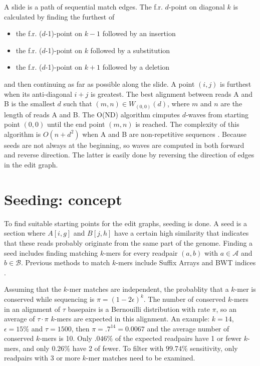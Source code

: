 \documentclass[../main/thesis.tex]{subfiles}
\begin{document}
A slide is a path of sequential match edges.
The f.r. $d$-point on diagonal $k$ is calculated by finding the furthest of
\begin{itemize}
\item the f.r. ($d$-1)-point on $k-1$ followed by an insertion
\item the f.r. ($d$-1)-point on $k$ followed by a substitution
\item the f.r. ($d$-1)-point on $k+1$ followed by a deletion
\end{itemize}
and then continuing as far as possible along the slide.
A point $(i,j)$ is furthest when its anti-diagonal $i+j$ is greatest.
The best alignment between reads A and B is the smallest $d$ such that $(m,n)\in W_{(0,0)}(d)$, where $m$ and $n$ are the length of reads A and B.
The O(ND) algorithm cimputes $d$-waves from starting point $(0,0)$ until the end point $(m,n)$ is reached.
The complexity of this algorithm is $O(n+d^2)$ when A and B are non-repetitive sequences \cite{Daligner}.
Because seeds are not always at the beginning, so waves are computed in both forward and reverse direction.
The latter is easily done by reversing the direction of edges in the edit graph.

\section{Seeding: concept}
To find suitable starting points for the edit graphs, seeding is done.
A seed is a section where $A[i,g]$ and $B[j,h]$ have a certain high similarity that indicates that these reads probably originate from the same part of the genome.
Finding a seed includes finding matching $k$-mers for every readpair $(a,b)$ with $a\in \mathcal{A}$ and $b\in \mathcal{B}$.
Previous methods to match $k$-mers include Suffix Arrays \cite{SA} and BWT indices \cite{BWT}.

Assuming that the $k$-mer matches are independent, the probablity that a $k$-mer is conserved while sequencing is $\pi = (1-2\epsilon)^k$.
The number of conserved $k$-mers in an alignment of $\tau$ basepairs is a Bernouilli distribution with rate $\pi$, so an average of $\tau\cdot\pi$ $k$-mers are expected in this alignment.
An example: $k=14$, $\epsilon=15\%$ and $\tau = 1500$, then $\pi = .7^{14} = 0.0067$ and the average number of conserved $k$-mers is 10.
Only $.046\%$ of the expected readpairs have 1 or fewer $k$-mers, and only $0.26\%$ have 2 of fewer.
To filter with $99.74\%$ sensitivity, only readpairs with 3 or more $k$-mer matches need to be examined.
\end{document}
